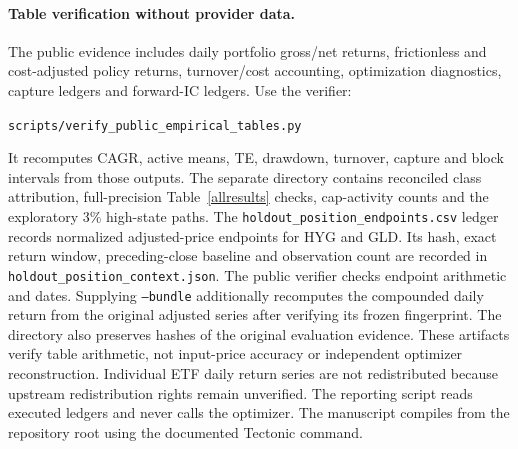 \documentclass[11pt,a4paper]{article}
\begin{document}
\paragraph{Table verification without provider data.}
The public evidence includes daily portfolio gross/net returns, frictionless and
cost-adjusted policy returns, turnover/cost accounting, optimization diagnostics,
capture ledgers and forward-IC ledgers. Use the verifier:\par
\noindent\mbox{\texttt{scripts/verify\_public\_empirical\_tables.py}}\par
It recomputes CAGR, active means,
TE, drawdown, turnover, capture and block intervals from those outputs.
The separate  directory contains
reconciled class attribution, full-precision Table~\ref{allresults} checks,
cap-activity counts and the exploratory 3\% high-state paths.
The \mbox{\texttt{holdout\_position\_endpoints.csv}} ledger records normalized
adjusted-price endpoints for HYG and GLD. Its hash, exact return window,
preceding-close baseline and observation count are recorded in
\mbox{\texttt{holdout\_position\_context.json}}. The public verifier checks
endpoint arithmetic and dates. Supplying \texttt{--bundle} additionally recomputes
the compounded daily return from the original adjusted series after verifying
its frozen fingerprint.
The directory also preserves hashes of the original evaluation evidence. These artifacts verify
table arithmetic, not input-price accuracy or independent optimizer reconstruction.
Individual ETF daily return series are not redistributed because upstream
redistribution rights remain unverified.
The reporting script reads executed
ledgers and never calls the optimizer. The manuscript compiles from the
repository root using the documented Tectonic command.
\end{document}

